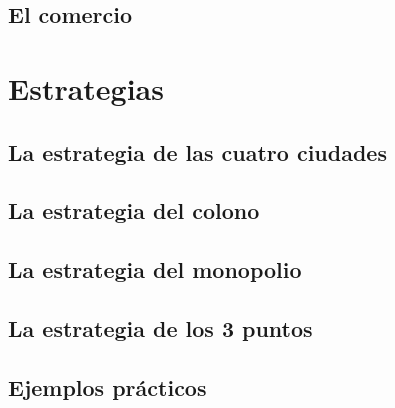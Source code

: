 \documentclass[onlymath]{beamer}
\begin{document}
\subsection{El comercio}
\section{Estrategias}
\subsection{La estrategia de las cuatro ciudades}
\subsection{La estrategia del colono}
\subsection{La estrategia del monopolio}
\subsection{La estrategia de los 3 puntos}
\subsection{Ejemplos prácticos}
\end{document}
